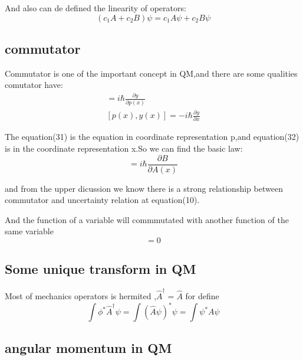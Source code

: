 \documentclass{article}
\begin{document}
  And also can de defined the linearity of operators:
  \begin{equation}
    (c_1A+c_2B)\psi=c_1A\psi+c_2B\psi
  \end{equation}

  \subsection{commutator}

Commutator is one of the important concept in QM,and there are some qualities comutator have:
\begin{align}
  [x,y(p(x))]=i\hbar\frac{ \partial y}{ \partial p(x)} \\
  [p(x),y(x)]=-i\hbar\frac{ \partial y}{ \partial x}
\end{align}

The equation(31) is the equation in coordinate representation p,and equation(32) is in the coordinate representation x.So we can find the basic law:
\begin{equation}
  [A(x),B(A(x))]=i\hbar\frac{ \partial B}{ \partial A(x)}
\end{equation}

and from the upper dicussion we know there is a strong relationship between commutator and uncertainty relation at equation(10).

And the function of a variable will commmutated with another function of the same variable
\begin{equation}
  [A(f),B(f)]=0
\end{equation}

\subsection{Some unique transform in QM}

Most of mechanics operators is hermited ,$\hat A^{\dagger}=\hat A$ for define
\begin{equation}
  \int \phi^*\hat A^{\dagger}\psi=\int (\hat A\psi)^*\psi=\int \psi^*A\psi
\end{equation}

\subsection{angular momentum in QM}
\end{document}
